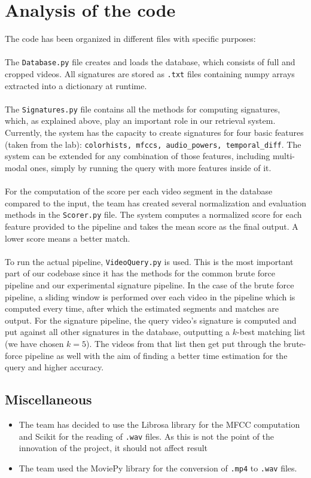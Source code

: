 \documentclass{article}
\begin{document}
\section*{Analysis of the code}
The code has been organized in different files with specific purposes: \\ \\
The \texttt{Database.py} file creates and loads the database, which consists of full and cropped videos. All signatures are stored as \texttt{.txt} files containing numpy arrays extracted into a dictionary at runtime.\\
\\The \texttt{Signatures.py} file contains all the methods for computing signatures, which, as explained above, play an important role in our retrieval system. Currently, the system has the capacity to create signatures for four basic features (taken from the lab): 
\texttt{colorhists, mfccs, audio\_powers, temporal\_diff}. The system can be extended for any combination of those features, including multi-modal ones, simply by running the query with more features inside of it.   \\
\\For the computation of the score per each video segment in the database compared to the input, the team has created several normalization and evaluation methods in the \texttt{Scorer.py} file. The system computes a normalized score for each feature provided to the pipeline and takes the mean score as the final output. A lower score means a better match.\\\\ 
To run the actual pipeline, \texttt{VideoQuery.py} is used. This is the most important part of our codebase since it has the methods for the common brute force pipeline and our experimental signature pipeline. In the case of the brute force pipeline, a sliding window is performed over each video in the pipeline which is computed every time, after which the estimated segments and matches are output. For the signature pipeline, the query video's signature is computed and put against all other signatures in the database, outputting a $k$-best matching list (we have chosen $k =5$). The videos from that list then get put through the brute-force pipeline as well with the aim of finding a better time estimation for the query and higher accuracy.   


\subsection*{Miscellaneous}
    \begin{itemize}
    \item The team has decided to use the Librosa library for the MFCC computation and Scikit for the reading of \texttt{.wav} files. As this is not the point of the innovation of the project, it should not affect result
    \item The team used the MoviePy library for the conversion of \texttt{.mp4} to \texttt{.wav} files.
    \end{itemize}
\end{document}
